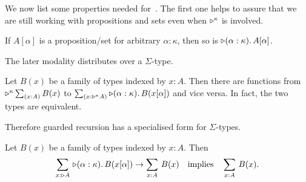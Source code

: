 \documentclass[a4paper,UKenglish,numberwithinsect,cleveref,thm-restate]{lipics-v2021}
\numberwithin{equation}{section}
\theoremstyle{definition}
\theoremstyle{plain}
\begin{document}
We now list some properties needed for~.
The first one helps to assure that we are still working with propositions and sets even when $\mathord{\triangleright}^\kappa$ is involved.
\begin{lemma}
  If $A[\alpha]$ is a proposition/set for arbitrary $\alpha : \kappa$, then so is $\mathord{\triangleright}(\alpha: \kappa).\, A [\alpha]$.
\end{lemma}
The later modality distributes over a $\Sigma$-type.
\begin{lemma}\label{lem:later-sum}
  Let $B(x)$ be a family of types indexed by $x : A$.
  Then there are functions from $\laterp^\kappa \sm{x : A} B(x)$ to $\sm{x : \laterp^\kappa A} \laterp (\alpha : \kappa).\, B(x [\alpha])$ and vice versa.
  In fact, the two types are equivalent.
\end{lemma}
Therefore guarded recursion has a specialised form for $\Sigma$-types.
\begin{corollary} \label{coro:lob-induction-sum}
  Let $B(x)$ be a family of types indexed by $x : A$.
  Then
  \[
    \sm{x : \laterp A} \laterp (\alpha : \kappa).\,B(x[\alpha]) \to \sm{x : A} B(x) \quad\text{implies}\quad \sm{x : A} B(x).
  \]
\end{corollary}
\end{document}
